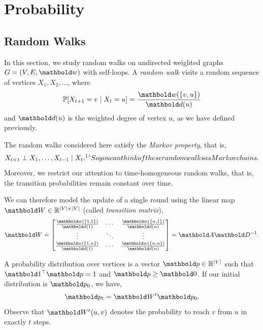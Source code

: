 
\chapter{Probability}

\section{Random Walks}

In this section, we study random walks on undirected weighted graphs $G = (\sV, \sE, \vw)$ with self-loops. A \emph{random walk} visits a random sequence of vertices $X_1, X_2, \dots$, where \begin{align}
    \Pr{X_{t+1} = v \mid X_t = u} = \frac{\vw(\{v, u\})}{\vd(u)}
\end{align} and $\vd(u)$ is the weighted degree of vertex $u$, as we have defined previously.

\begin{rmk}
The random walks considered here satisfy the \emph{Markov property}, that is, \begin{align}
    X_{t+1} \perp X_1, \dots, X_{t-1} \mid X_t.\safefootnote{So you can think of these random walks as Markov chains.}
\end{align} Moreover, we restrict our attention to time-homogeneous random walks, that is, the transition probabilities remain constant over time.
\end{rmk}

We can therefore model the update of a single round using the linear map $\mW \in \R^{|\sV|\times|\sV|}$ (called \emph{transition matrix}), \begin{align}
    \mW \defeq \begin{bmatrix}
    \frac{\vw(\{1,1\})}{\vd(1)} & \cdots & \frac{\vw(\{n, 1\})}{\vd(n)} \\
    \vdots & \ddots & \vdots \\
    \frac{\vw(\{1,n\})}{\vd(1)} & \cdots & \frac{\vw(\{n, n\})}{\vd(n)} \\
    \end{bmatrix} = \mA\inv{\mD}.
\end{align}

A probability distribution over vertices is a vector $\vp \in \R^{|\sV|}$ such that $\trans{\vOne}\vp = 1$ and $\vp \geq \vZero$. If our initial distribution is $\vp_0$, we have, \begin{align}
    \vp_t = \mW^t\vp_0.
\end{align} Observe that $\mW^t(u,v)$ denotes the probability to reach $v$ from $u$ in exactly $t$ steps.

